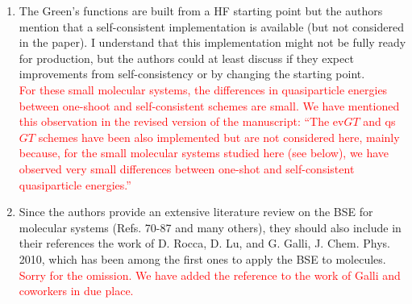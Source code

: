 \documentclass[10pt]{letter}
\newcommand{\alert}[1]{\textcolor{red}{#1}}
\begin{document}
\begin{letter}
\begin{enumerate}
\item 
{The Green's functions are built from a HF starting point but the authors mention that a self-consistent implementation is available (but not considered in the paper). 
I understand that this implementation might not be fully ready for production, but the authors could at least discuss if they expect improvements from self-consistency or by changing the starting point.}
\\
\alert{
For these small molecular systems, the differences in quasiparticle energies between one-shoot and self-consistent schemes are small.
We have mentioned this observation in the revised version of the manuscript: ``The ev$GT$ and qs$GT$ schemes have been also implemented but are not considered here, mainly because, for the small molecular systems studied here (see below), we have observed very small differences between one-shot and self-consistent quasiparticle energies.''
}

\item 
{Since the authors provide an extensive literature review on the BSE for molecular systems (Refs. 70-87 and many others), they should also include in their references the work of D. Rocca, D. Lu, and G. Galli, J. Chem. Phys. 2010, which has been among the first ones to apply the BSE to molecules. 
}
\\
\alert{
Sorry for the omission. 
We have added the reference to the work of Galli and coworkers in due place.
}

\end{enumerate}


\end{letter}
\end{document}
